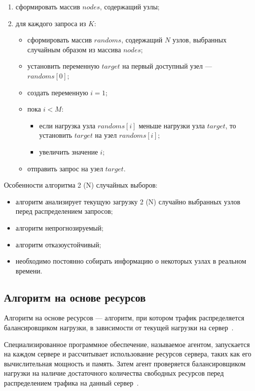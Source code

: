 \begin{enumerate}
	\item сформировать массив $nodes$, содержащий узлы;
	\item для каждого запроса из $K$:
	\begin{itemize}
		\item сформировать массив $randoms$, содержащий $N$ узлов, выбранных случайным образом из массива $nodes$;
		\item установить переменную $target$ на первый доступный узел --- $randoms[0]$;
		\item создать переменную $i = 1$;
		\item пока $i < M$:
		\begin{itemize}
			\item если нагрузка узла $randoms[i]$ меньше нагрузки узла $target$, то установить $target$ на узел $randoms[i]$;
			\item увеличить значение $i$;
		\end{itemize}
		\item отправить запрос на узел $target$.
	\end{itemize}
\end{enumerate}

Особенности алгоритма 2 (N) случайных выборов:
\begin{itemize}
    \item алгоритм анализирует текущую загрузку 2 (N) случайно выбранных узлов перед распределением запросов;
    \item алгоритм непрогнозируемый;
    \item алгоритм отказоустойчивый; 
    \item необходимо постоянно собирать информацию о некоторых узлах в реальном времени.
\end{itemize}

\subsection{Алгоритм на основе ресурсов}

Алгоритм на основе ресурсов --- алгоритм, при котором трафик распределяется балансировщиком нагрузки, в зависимости от текущей нагрузки на сервер~\cite{aws}.

Специализированное программное обеспечение, называемое агентом, запускается на каждом сервере и рассчитывает использование ресурсов сервера, таких как его вычислительная мощность и память. 
Затем агент проверяется балансировщиком нагрузки на наличие достаточного количества свободных ресурсов перед распределением трафика на данный сервер~\cite{aws}.

